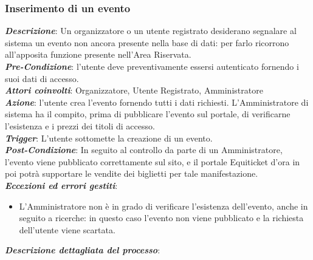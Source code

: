 \subsubsection{Inserimento di un evento}
\textbf{\textit{Descrizione}}: Un organizzatore o un utente registrato desiderano segnalare al sistema un evento non ancora presente nella base di dati: per farlo ricorrono all'apposita funzione presente nell'Area Riservata. \\
\textbf{\textit{Pre-Condizione}}: l'utente deve preventivamente essersi autenticato fornendo i suoi dati di accesso. \\
\textbf{\textit{Attori coinvolti}}: Organizzatore, Utente Registrato, Amministratore \\
\textbf{\textit{Azione}}: l'utente crea l'evento fornendo tutti i dati richiesti. L'Amministratore di sistema ha il compito, prima di pubblicare l'evento sul portale, di verificarne l'esistenza e i prezzi dei titoli di accesso. \\
\textbf{\textit{Trigger}}: L'utente sottomette la creazione di un evento. \\
\textbf{\textit{Post-Condizione}}: In seguito al controllo da parte di un Amministratore, l'evento viene pubblicato correttamente sul sito, e il portale Equiticket d'ora in poi potrà supportare le vendite dei biglietti per tale manifestazione. \\
\textbf{\textit{Eccezioni ed errori gestiti}}: 
\begin{itemize}
\item L'Amministratore non è in grado di verificare l'esistenza dell'evento, anche in seguito a ricerche: in questo caso l'evento non viene pubblicato e la richiesta dell'utente viene scartata. 
\end{itemize}
\textbf{\textit{Descrizione dettagliata del processo}}:
